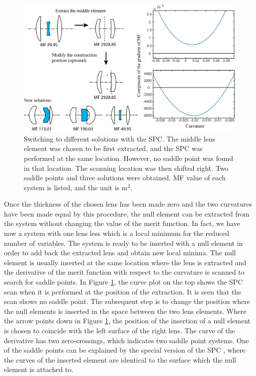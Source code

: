 \begin{figure}[h!]
    \centering
    \includegraphics[scale=0.68]{chapter-2/figures/spc_switch.png}
    \caption{Switching to different solutions with the SPC. The middle lens element was chosen to be first extracted, and the SPC was performed at the same location. However, no saddle point was found in that location. The scanning location was then shifted right. Two saddle points and three solutions were obtained. MF value of each system is listed, and the unit is \textmu m$^2$. }
    \label{fig:SPC-switch-example}
\end{figure}

Once the thickness of the chosen lens has been made zero and the two curvatures have been made equal by this procedure, the null element can be extracted from the system without changing the value of the merit function. In fact, we have now a system with one lens less which is a local minimum for the reduced number of variables. The system is ready to be inserted with a null element in order to add back the extracted lens and obtain new local minima. The null element is usually inserted at the same location where the lens is extracted and the derivative of the merit function with respect to the curvature is scanned to search for saddle points. In Figure \ref{fig:SPC-switch-example}, the curve plot on the top shows the SPC scan when it is performed at the position of the extraction. It is seen that the scan shows no saddle point. The subsequent step is to change the position where the null elements is inserted in the space between the two lens elements. Where the arrow points down in Figure \ref{fig:SPC-switch-example}, the position of the insertion of a null element is chosen to coincide with the left surface of the right lens. The curve of the derivative has two zero-crossings, which indicates two saddle point systems. One of the saddle points can be explained by the special version of the SPC \cite{BociortSPCSexplained}, where the curves of the inserted element are identical to the surface which the null element is attached to. 

